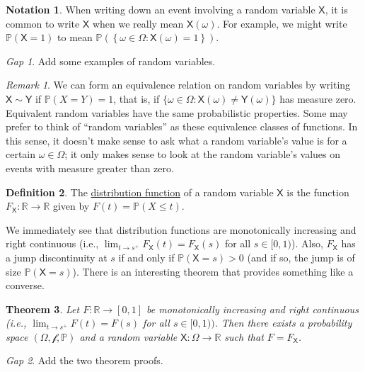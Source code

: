 \documentclass[11pt]{article}
\newcommand{\col}[1]{\mathscr{#1}}
\newcommand{\rv}[1]{\mathsf{#1}}
\newcommand{\p}{\mathbb{P}}
\newcommand{\defname}[1]{\underline{#1}}
\newcommand{\RR}{\mathbb{R}}
\theoremstyle{theorem}
\newtheorem{theorem}{Theorem}[section]
\theoremstyle{definition}
\newtheorem{definition}[theorem]{Definition}
\newtheorem{notation}[theorem]{Notation}
\theoremstyle{remark}
\newtheorem*{remark}{Remark}
\theoremstyle{step}
\theoremstyle{gap}
\newtheorem*{gap}{Gap}
\begin{document}
\begin{notation}
When writing down an event involving a random variable \(\rv{X}\), it is common to write \(\rv{X}\) when we really mean \(\rv{X}(\omega)\). For example, we might write \(\p(\rv{X} = 1)\) to mean \(\p\left(\left\{\omega \in \Omega : \rv{X}(\omega) = 1\right\}\right)\).
\end{notation}


\begin{gap}
Add some examples of random variables.
\end{gap}

\begin{remark}
We can form an equivalence relation on random variables by writing \(\rv{X} \sim \rv{Y}\) if \(\p(X=Y)=1\), that is, if \(\{\omega \in \Omega : \rv{X}(\omega) \neq \rv{Y}(\omega)\}\) has measure zero. Equivalent random variables have the same probabilistic properties. Some may prefer to think of ``random variables'' as these equivalence classes of functions. In this sense, it doesn't make sense to ask what a random variable's value is for a certain \(\omega \in \Omega\); it only makes sense to look at the random variable's values on events with measure greater than zero.
\end{remark}

\begin{definition}
The \defname{distribution function} of a random variable \(\rv{X}\) is the function \(F_\rv{X}: \RR \to \RR\) given by \(F(t) = \p(X \leq t)\).
\end{definition}

We immediately see that distribution functions are monotonically increasing and right continuous (i.e., \(\lim_{t\to s^+} F_\rv{X}(t) = F_\rv{X}(s)\) for all \(s \in [0,1)\)). Also, \(F_\rv{X}\) has a jump discontinuity at \(s\) if and only if \(\p(\rv{X} = s) > 0\) (and if so, the jump is of size \(\p(\rv{X} = s)\)). There is an interesting theorem that provides something like a converse.

\begin{theorem}
Let \(F:\RR \to [0,1]\) be monotonically increasing and right continuous (i.e., \(\lim_{t\to s^+} F(t) = F(s)\) for all \(s \in [0,1))\). Then there exists a probability space \((\Omega, \col{f}, \p)\) and a random variable \(\rv{X}:\Omega \to \RR\) such that \(F = F_\rv{X}\).
\end{theorem}

\begin{gap}
Add the two theorem proofs.
\end{gap}
\end{document}
